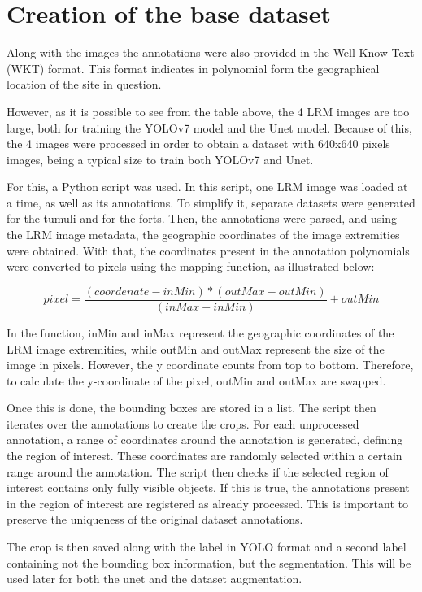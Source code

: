 \section{Creation of the base dataset}

Along with the images the annotations were also provided in the Well-Know Text (WKT) format. This format indicates in polynomial form the geographical location of the site in question.

However, as it is possible to see from the table above, the 4 LRM images are too large, both for training the YOLOv7 model and the Unet model. Because of this, the 4 images were processed in order to obtain a dataset with 640x640 pixels images, being a typical size to train both YOLOv7 and Unet.

For this, a Python script was used. In this script, one LRM image was loaded at a time, as well as its annotations. To simplify it, separate datasets were generated for the tumuli and for the forts. Then, the annotations were parsed, and using the LRM image metadata, the geographic coordinates of the image extremities were obtained. With that, the coordinates present in the annotation polynomials were converted to pixels using the mapping function, as illustrated below:

\begin{equation}
     pixel = \frac{(coordenate - inMin) * (outMax - outMin)} {(inMax - inMin)} + outMin
     \label{Map function}
\end{equation}

In the function, inMin and inMax represent the geographic coordinates of the LRM image extremities, while outMin and outMax represent the size of the image in pixels. However, the y coordinate counts from top to bottom. Therefore, to calculate the y-coordinate of the pixel, outMin and outMax are swapped.

Once this is done, the bounding boxes are stored in a list. The script then iterates over the annotations to create the crops. For each unprocessed annotation, a range of coordinates around the annotation is generated, defining the region of interest. These coordinates are randomly selected within a certain range around the annotation. The script then checks if the selected region of interest contains only fully visible objects. If this is true, the annotations present in the region of interest are registered as already processed. This is important to preserve the uniqueness of the original dataset annotations. 

The crop is then saved along with the label in YOLO format and a second label containing not the bounding box information, but the segmentation. This will be used later for both the unet and the dataset augmentation.

